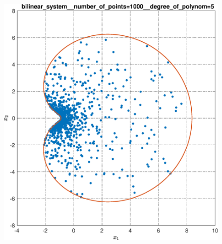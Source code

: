 \documentclass[../main.tex]{subfiles}
\begin{document}
   \begin{figure}[ht!] 
  	\hspace{-2.5ex}
  	\begin{minipage}[b]{.49\linewidth} 
  		\small
  		\centering 
  		\includegraphics[width=\linewidth]{images/bilinear_system__number_of_points=1000__degree_of_polynom=5.eps}
  	\end{minipage}
  	\hfill
  	\begin{minipage}[b]{.49\linewidth} 
  		\small
  		\centering

\end{minipage}
\end{figure}
\end{document}
